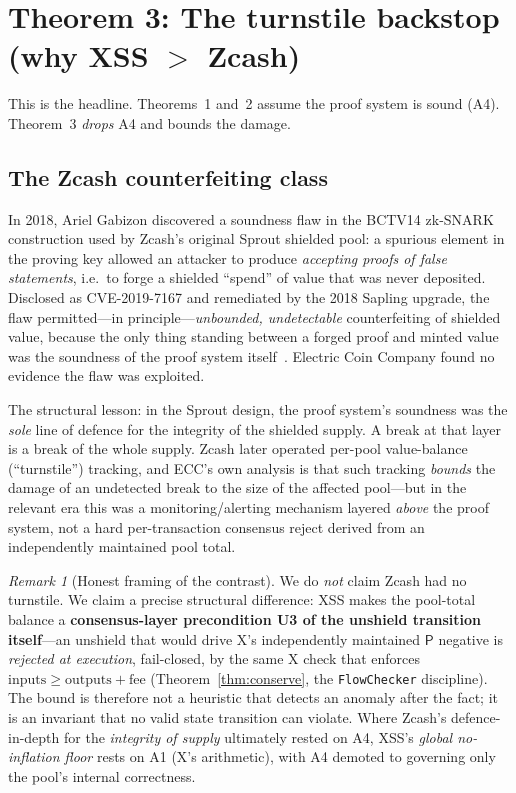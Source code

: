 \documentclass[11pt]{article}
\theoremstyle{definition}
\theoremstyle{remark}
\newtheorem{remark}{Remark}
\newcommand{\pool}{\mathsf{P}}
\begin{document}
\section{Theorem 3: The turnstile backstop (why XSS $>$ Zcash)}
\label{sec:t3}

This is the headline. Theorems~1 and~2 assume the proof system is sound
(A4). Theorem~3 \emph{drops} A4 and bounds the damage.

\subsection{The Zcash counterfeiting class}
\label{sec:zcash}

In 2018, Ariel Gabizon discovered a soundness flaw in the BCTV14 zk-SNARK
construction used by Zcash's original Sprout shielded pool: a spurious
element in the proving key allowed an attacker to produce \emph{accepting
proofs of false statements}, i.e.\ to forge a shielded ``spend'' of value
that was never deposited. Disclosed as CVE-2019-7167 and remediated by the
2018 Sapling upgrade, the flaw permitted---in principle---\emph{unbounded,
undetectable} counterfeiting of shielded value, because the only thing
standing between a forged proof and minted value was the soundness of the
proof system itself~\cite{ecc2019,zfnd2019}. Electric Coin Company found no
evidence the flaw was exploited.

The structural lesson: in the Sprout design, the proof system's soundness
was the \emph{sole} line of defence for the integrity of the shielded
supply. A break at that layer is a break of the whole supply. Zcash later
operated per-pool value-balance (``turnstile'') tracking, and ECC's own
analysis is that such tracking \emph{bounds} the damage of an undetected
break to the size of the affected pool---but in the relevant era this was
a monitoring/alerting mechanism layered \emph{above} the proof system, not a
hard per-transaction consensus reject derived from an independently
maintained pool total.

\begin{remark}[Honest framing of the contrast]
\label{rem:honestzcash}
We do \emph{not} claim Zcash had no turnstile. We claim a precise structural
difference: XSS makes the pool-total balance a \textbf{consensus-layer
precondition U3 of the unshield transition itself}---an unshield that would
drive X's independently maintained $\pool$ negative is \emph{rejected at
execution}, fail-closed, by the same X check that enforces
$\mathrm{inputs}\ge\mathrm{outputs}+\mathrm{fee}$ (Theorem~\ref{thm:conserve},
the \texttt{FlowChecker} discipline). The bound is therefore not a heuristic
that detects an anomaly after the fact; it is an invariant that no valid
state transition can violate. Where Zcash's defence-in-depth for the
\emph{integrity of supply} ultimately rested on A4, XSS's
\emph{global no-inflation floor} rests on A1 (X's arithmetic), with A4
demoted to governing only the pool's internal correctness.
\end{remark}
\end{document}
